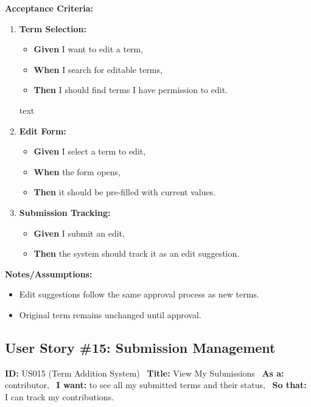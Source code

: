 \documentclass[12pt]{article}
\begin{document}
\vspace{1em}
\textbf{Acceptance Criteria:}
\begin{enumerate}
\item \textbf{Term Selection:}
\begin{itemize}
\item \textbf{Given} I want to edit a term,
\item \textbf{When} I search for editable terms,
\item \textbf{Then} I should find terms I have permission to edit.
\end{itemize}

text
\item \textbf{Edit Form:}
\begin{itemize}
    \item \textbf{Given} I select a term to edit,
    \item \textbf{When} the form opens,
    \item \textbf{Then} it should be pre-filled with current values.
\end{itemize}

\item \textbf{Submission Tracking:}
\begin{itemize}
    \item \textbf{Given} I submit an edit,
    \item \textbf{Then} the system should track it as an edit suggestion.
\end{itemize}
\end{enumerate}

\vspace{1em}
\textbf{Notes/Assumptions:}
\begin{itemize}
\item Edit suggestions follow the same approval process as new terms.
\item Original term remains unchanged until approval.
\end{itemize}

\subsection{User Story \#15: Submission Management}
\textbf{ID:} US015 (Term Addition System) \
\textbf{Title:} View My Submissions \
\textbf{As a:} contributor, \
\textbf{I want:} to see all my submitted terms and their status, \
\textbf{So that:} I can track my contributions.
\end{document}
